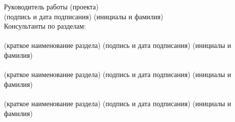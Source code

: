 \begin{titlepage}
\begin{flushleft}
		Руководитель работы (проекта) \underline{\hspace{5cm}}%
			\hfill\underline{\hspace{4cm}}\\
		\vspace{-.2cm}\hspace{7.3cm}\footnotesize(подпись и дата подписания)%
			\hspace{2.2cm}(инициалы и фамилия)\normalsize\\
		Консультанты по разделам:\\
		\underline{\hspace{7.5cm}}\hspace{1cm}\underline{\hspace{4cm}}%
			\hspace{1cm}\underline{\hspace{4cm}}\\
		\vspace{-.2cm}\hspace{1.5cm}\footnotesize(краткое наименование раздела)%
			\hspace{2cm}(подпись и дата подписания)%
			\hspace{1.1cm}(инициалы и фамилия)\normalsize\\
		\underline{\hspace{7.5cm}}\hspace{1cm}\underline{\hspace{4cm}}%
			\hspace{1cm}\underline{\hspace{4cm}}\\
		\vspace{-.2cm}\hspace{1.5cm}\footnotesize(краткое наименование раздела)%
			\hspace{2cm}(подпись и дата подписания)%
			\hspace{1.1cm}(инициалы и фамилия)\normalsize\\
		\underline{\hspace{7.5cm}}\hspace{1cm}\underline{\hspace{4cm}}%
			\hspace{1cm}\underline{\hspace{4cm}}\\
		\vspace{-.2cm}\hspace{1.5cm}\footnotesize(краткое наименование раздела)%
			\hspace{2cm}(подпись и дата подписания)%
			\hspace{1.1cm}(инициалы и фамилия)\normalsize\\

\end{flushleft}
\end{titlepage}
